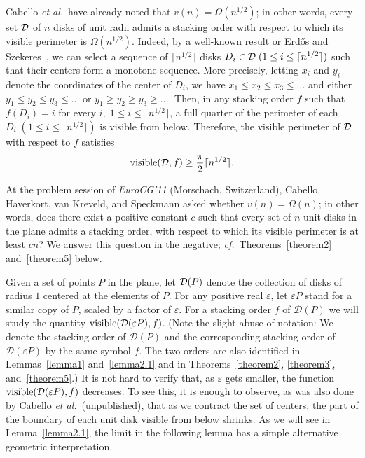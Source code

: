 \documentclass[11pt]{article}
\DeclareMathOperator{\vis}{\mathrm{visible}}
\newcommand{\eps}{\varepsilon}
\begin{document}
Cabello {\em et al.}\ have already noted that $v(n)=\Omega(n^{1/2})$; in other
words, every set $\cal D$ of $n$ disks of unit radii admits
a stacking order with respect to which its visible perimeter is
$\Omega(n^{1/2})$. Indeed, by a well-known result or Erd\H os and
Szekeres~\cite{ErSz35}, we can select a sequence of $\lceil n^{1/2}\rceil$
disks $D_i\in {\cal D}\; (1\le i\le \lceil n^{1/2}\rceil)$ such that their
centers form a monotone sequence. More precisely, letting $x_i$ and $y_i$
denote the coordinates of the center of $D_i$, we have $x_1\le x_2\le
x_3\le\ldots$ and either $y_1\le y_2\le y_3\le\ldots$ or $y_1\ge y_2\ge
y_3\ge\ldots$. Then, in any stacking order $f$ such that $f(D_i)=i$ for every
$i,\; 1\le i\le \lceil n^{1/2}\rceil$, a full quarter of the perimeter of each $D_i\; (1\le i\le \lceil n^{1/2}\rceil)$ is visible from below. Therefore, the visible perimeter of $\cal D$ with respect to $f$ satisfies $$\vis({\cal D},f)\ge \frac{\pi}{2}\lceil n^{1/2}\rceil.$$

At the problem session of {\em EuroCG'11} (Morschach, Switzerland), Cabello, Haverkort, van Kreveld, and Speckmann asked whether $v(n)=\Omega(n)$; in other words, does there exist a positive constant $c$ such that every set of $n$ unit disks in the plane admits a stacking order, with respect to which its visible perimeter is at least $cn$?  We answer this question in the negative; {\em cf.}\ Theorems~\ref{theorem2} and~\ref{theorem5} below.

Given a set of points $P$ in the plane, let ${\cal D}(P)$ denote the
collection of disks of radius $1$ centered at the elements of $P$. For any
positive real $\eps$, let $\eps P$ stand for a similar copy of $P$, scaled by
a factor of $\eps$. For a stacking order $f$ of $\mathcal D(P)$ we will study
the quantity $\vis({\cal D}(\eps P),f)$. (Note the slight abuse of notation:
We denote the stacking order of $\mathcal D(P)$ and the corresponding
stacking order of $\mathcal D(\eps P)$ by the same symbol $f$. The two orders are also identified in Lemmas~\ref{lemma1} and~\ref{lemma2.1} and in Theorems~\ref{theorem2}, \ref{theorem3}, and~\ref{theorem5}.) It is not hard to verify that, as $\eps$ gets smaller, the function $\vis({\cal D}(\eps P),f)$ decreases. To see this, it is enough to observe, as was also done by
Cabello {\em et al.}\ (unpublished), that as we contract the set of centers,
the part of the boundary of each unit disk visible from below shrinks. As we
will see in Lemma~\ref{lemma2.1}, the limit in the following lemma has a simple alternative geometric interpretation.
\end{document}
